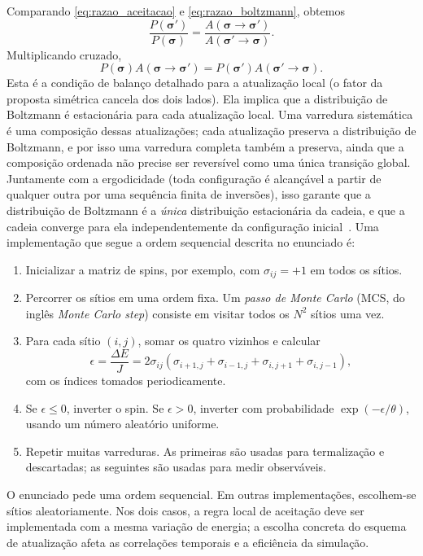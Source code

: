 \documentclass[12pt,a4paper]{article}
\newcommand{\thetaT}{\theta}
\begin{document}
%
Comparando \eqref{eq:razao_aceitacao} e \eqref{eq:razao_boltzmann}, obtemos
%
\[
    \frac{P(\bm\sigma')}{P(\bm\sigma)}
    =\frac{A(\bm\sigma\to\bm\sigma')}{A(\bm\sigma'\to\bm\sigma)}.
\]
%
Multiplicando cruzado,
%
\begin{equation}
    P(\bm\sigma)A(\bm\sigma\to\bm\sigma')
    =P(\bm\sigma')A(\bm\sigma'\to\bm\sigma).
    \label{eq:balance_detalhado}
\end{equation}
%
Esta é a condição de balanço detalhado para a atualização local (o fator da proposta simétrica cancela dos dois lados). Ela implica que a distribuição de Boltzmann é estacionária para cada atualização local. Uma varredura sistemática é uma composição dessas atualizações; cada atualização preserva a distribuição de Boltzmann, e por isso uma varredura completa também a preserva, ainda que a composição ordenada não precise ser reversível como uma única transição global. Juntamente com a ergodicidade (toda configuração é alcançável a partir de qualquer outra por uma sequência finita de inversões), isso garante que a distribuição de Boltzmann é a
\emph{única} distribuição estacionária da cadeia, e que a cadeia converge para ela independentemente da configuração inicial~\cite{NewmanBarkema1999,LandauBinder2005}. Uma implementação que segue a ordem sequencial descrita no enunciado é:
%
\begin{enumerate}
    \item Inicializar a matriz de spins, por exemplo, com $\sigma_{ij}=+1$ em todos os sítios.
    \item Percorrer os sítios em uma ordem fixa. Um \emph{passo de Monte Carlo} (MCS, do inglês \textit{Monte Carlo step}) consiste em visitar todos os $N^2$ sítios uma vez.
    \item Para cada sítio $(i,j)$, somar os quatro vizinhos e calcular
    \[
        \epsilon=\frac{\Delta E}{J}=2\sigma_{ij}
        (\sigma_{i+1,j}+\sigma_{i-1,j}+\sigma_{i,j+1}+\sigma_{i,j-1}),
    \]
    com os índices tomados periodicamente.
    \item Se $\epsilon\leq0$, inverter o spin. Se $\epsilon>0$, inverter com probabilidade $\exp(-\epsilon/\thetaT)$, usando um número aleatório uniforme.
    \item Repetir muitas varreduras. As primeiras são usadas para termalização e descartadas; as seguintes são usadas para medir observáveis.
\end{enumerate}
%
O enunciado pede uma ordem sequencial. Em outras implementações, escolhem-se sítios aleatoriamente. Nos dois casos, a regra local de aceitação deve ser implementada com a mesma variação de energia; a escolha concreta do esquema de atualização afeta as correlações temporais e a eficiência da simulação.
\end{document}
